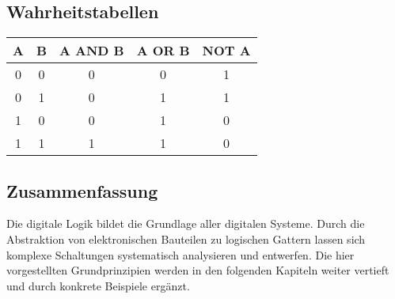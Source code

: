 \subsection{Wahrheitstabellen}
\begin{center}
\begin{tabular}{c c | c | c | c}
A & B & A AND B & A OR B & NOT A\\
\hline
0 & 0 & 0 & 0 & 1\\
0 & 1 & 0 & 1 & 1\\
1 & 0 & 0 & 1 & 0\\
1 & 1 & 1 & 1 & 0\\
\end{tabular}
\end{center}

\subsection{Zusammenfassung}
Die digitale Logik bildet die Grundlage aller digitalen Systeme. 
Durch die Abstraktion von elektronischen Bauteilen zu logischen Gattern lassen sich komplexe Schaltungen systematisch analysieren und entwerfen. 
Die hier vorgestellten Grundprinzipien werden in den folgenden Kapiteln weiter vertieft und durch konkrete Beispiele ergänzt.
